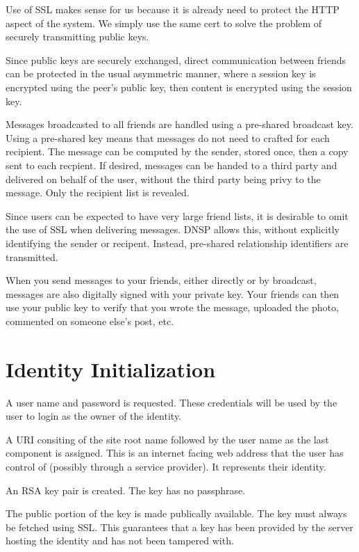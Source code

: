 \documentclass[letterpaper,11pt,oneside]{article}
\begin{document}
Use of SSL makes sense for us because it is already need to protect the HTTP
aspect of the system. We simply use the same cert to solve the problem of
securely transmitting public keys.

Since public keys are securely exchanged, direct communication between friends
can be protected in the usual asymmetric manner, where a session key is
encrypted using the peer's public key, then content is encrypted using the
session key.

Messages broadcasted to all friends are handled using a pre-shared broadcast
key. Using a pre-shared key means that messages do not need to crafted for each
recipient. The message can be computed by the sender, stored once, then a copy
sent to each recpient. If desired, messages can be handed to a third party and
delivered on behalf of the user, without the third party being privy to the
message. Only the recipient list is revealed.

Since users can be expected to have very large friend lists, it is desirable to
omit the use of SSL when delivering messages. DNSP allows this, without
explicitly identifying the sender or recipent. Instead, pre-shared relationship
identifiers are transmitted.

When you send messages to your friends, either directly or by broadcast,
messages are also digitally signed with your private key. Your friends can then
use your public key to verify that you wrote the message, uploaded the photo,
commented on someone else's post, etc.

\section{Identity Initialization}

A user name and password is requested. These credentials will be used by the
user to login as the owner of the identity.

A URI consiting of the site root name followed by the user name as the last
component is assigned. This is an internet facing web address that the user has
control of (possibly through a service provider). It represents their identity.

An RSA key pair is created. The key has no passphrase. 

The public portion of the key is made publically available. The key must always
be fetched using SSL. This guarantees that a key has been provided by the
server hosting the identity and has not been tampered with.
\end{document}
